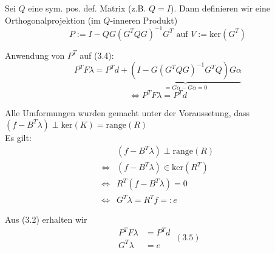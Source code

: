 Sei $Q$ eine sym. pos. def. Matrix (z.B. $Q=I$). Dann definieren wir eine Orthogonalprojektion (im $Q$-inneren Produkt)
\[ P:=I-QG(G^TQG)^{-1}G^T \text{ auf } V:= \text{ker}(G^T) \]

Anwendung von $P^T$  auf (3.4):
\[ P^TF\lambda = P^Td + \underbrace{(I-G(G^TQG)^{-1}G^TQ)G\alpha}_{=G\alpha - G\alpha=0} \]
\[ \Leftrightarrow \boxed{P^TF\lambda = P^T d } \]

Alle Umformungen wurden gemacht unter der Voraussetung, dass $ (f-B^T\lambda)\perp \text{ker}(K)=\text{range}(R)$ \\

Es gilt:
\begin{align*}
  & (f-B^T\lambda)\perp \text{range}(R) \\
  \Leftrightarrow & (f-B^T\lambda) \in \text{ker} (R^T) \\
  \Leftrightarrow & R^T(f-B^T\lambda)=0 \\
  \Leftrightarrow & G^T\lambda = R^Tf =:e
\end{align*}

Aus (3.2) erhalten wir
\[ 
  \boxed{
    \begin{aligned}
      P^TF\lambda &= P^Td \\
      G^T\lambda &= e  
    \end{aligned}
  } \, (3.5) 
\]

